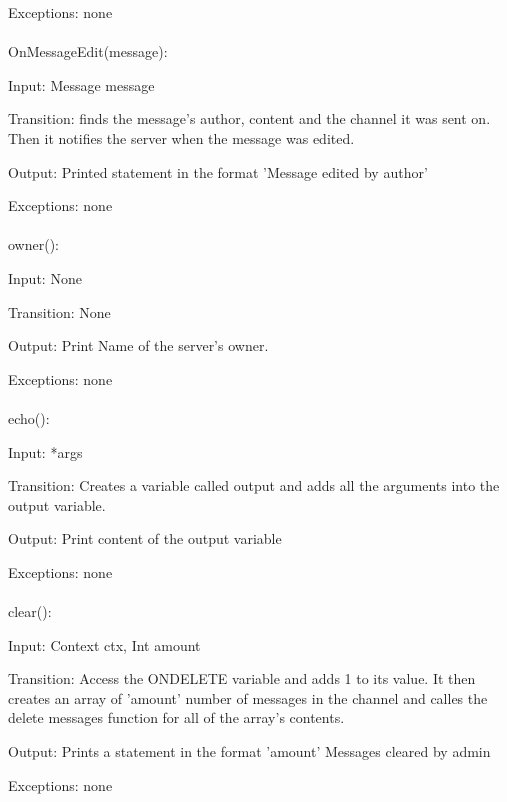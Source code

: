 \documentclass[12,english]{article}
\begin{document}
		Exceptions: none\\ 
		\\ 
		OnMessageEdit(message):
		
		Input: Message message
		
		Transition: finds the message's author, content and the channel it was sent on. Then it notifies the server when the message was edited.
		
		Output: Printed statement in the format 'Message edited by {author}'
		
		Exceptions: none\\
		\\
		owner():
		
		Input: None
		
		Transition: None
		
		Output: Print Name of the server's owner.
		
		Exceptions: none\\
		\\
		echo():
		
		Input: *args
		
		Transition: Creates a variable called output and adds all the arguments into the output variable.
		
		Output: Print content of the output variable
		
		Exceptions: none\\ 
		\\
		clear():
		
		Input: Context ctx, Int amount
		
		Transition: Access the ONDELETE variable and adds 1 to its value. It then creates an array of 'amount' number of messages in the channel and calles the delete messages function for all of the array's contents.

		Output: Prints a statement in the format 'amount' Messages cleared by admin
		
		Exceptions: none\\
\end{document}
